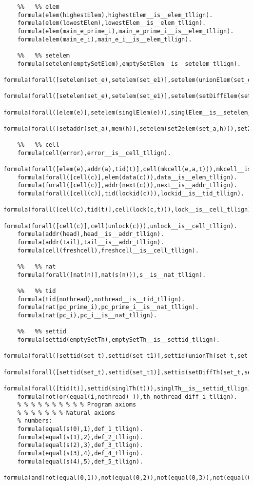 \begin{lstlisting}
    %%   %% elem
    formula(elem(highestElem),highestElem__is__elem_tllign).
    formula(elem(lowestElem),lowestElem__is__elem_tllign).
    formula(elem(main_e_prime_i),main_e_prime_i__is__elem_tllign).
    formula(elem(main_e_i),main_e_i__is__elem_tllign).

    %%   %% setelem
    formula(setelem(emptySetElem),emptySetElem__is__setelem_tllign).
    formula(forall([setelem(set_e),setelem(set_e1)],setelem(unionElem(set_e,set_e1))),unionElem__is__setelem_tllign).
    formula(forall([setelem(set_e),setelem(set_e1)],setelem(setDiffElem(set_e,set_e1))),setDiffElem__is__setelem_tllign).
    formula(forall([elem(e)],setelem(singlElem(e))),singlElem__is__setelem_tllign).
    formula(forall([setaddr(set_a),mem(h)],setelem(set2elem(set_a,h))),set2elem__is__setelem_tllign).

    %%   %% cell
    formula(cell(error),error__is__cell_tllign).
    formula(forall([elem(e),addr(a),tid(t)],cell(mkcell(e,a,t))),mkcell__is__cell_tllign).
    formula(forall([cell(c)],elem(data(c))),data__is__elem_tllign).
    formula(forall([cell(c)],addr(next(c))),next__is__addr_tllign).
    formula(forall([cell(c)],tid(lockid(c))),lockid__is__tid_tllign).
    formula(forall([cell(c),tid(t)],cell(lock(c,t))),lock__is__cell_tllign).
    formula(forall([cell(c)],cell(unlock(c))),unlock__is__cell_tllign).
    formula(addr(head),head__is__addr_tllign).
    formula(addr(tail),tail__is__addr_tllign).
    formula(cell(freshcell),freshcell__is__cell_tllign).

    %%   %% nat
    formula(forall([nat(n)],nat(s(n))),s__is__nat_tllign).

    %%   %% tid
    formula(tid(nothread),nothread__is__tid_tllign).
    formula(nat(pc_prime_i),pc_prime_i__is__nat_tllign).
    formula(nat(pc_i),pc_i__is__nat_tllign).

    %%   %% settid
    formula(settid(emptySetTh),emptySetTh__is__settid_tllign).
    formula(forall([settid(set_t),settid(set_t1)],settid(unionTh(set_t,set_t1))),unionTh__is__settid_tllign).
    formula(forall([settid(set_t),settid(set_t1)],settid(setDiffTh(set_t,set_t1))),setDiffTh__is__settid_tllign).
    formula(forall([tid(t)],settid(singlTh(t))),singlTh__is__settid_tllign).
    formula(not(or(equal(i,nothread) )),th_nothread_diff_i_tllign).
    % % % % % % % % % % Program axioms
    % % % % % % % Natural axioms
    % numbers:
    formula(equal(s(0),1),def_1_tllign).
    formula(equal(s(1),2),def_2_tllign).
    formula(equal(s(2),3),def_3_tllign).
    formula(equal(s(3),4),def_4_tllign).
    formula(equal(s(4),5),def_5_tllign).
    formula(and(not(equal(0,1)),not(equal(0,2)),not(equal(0,3)),not(equal(0,4)),not(equal(1,2)),not(equal(1,3)),not(equal(1,4)),not(equal(2,3)),not(equal(2,4)),not(equal(3,4))),nums_are_different_tllign).


\end{lstlisting}
